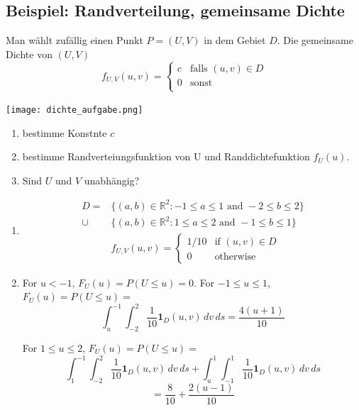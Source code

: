 \BoxEnd{}
\BoxStart{}
\subsection{Beispiel: Randverteilung, gemeinsame Dichte}
\begin{tiny}
  Man wählt zufällig einen Punkt $P = (U, V)$ in dem Gebiet $D$. Die gemeinsame Dichte von $(U, V)$
  \[
    f_{U, V} (u, v) =
    \begin{cases}
      c & \text{falls } (u, v) \in D \\
      0 & \text{sonst}               \\
    \end{cases}
  \]
  \begin{center}
    \texttt{[image: dichte\_aufgabe.png]}
  \end{center}
  \begin{enumerate}[noitemsep,topsep=0pt,parsep=0pt,partopsep=0pt]
    \item bestimme Konstnte $c$
    \item bestimme Randverteiungsfunktion von U und Randdichtefunktion $f_U(u)$.
    \item Sind $U$ und $V$ unabhängig?
  \end{enumerate}
  \begin{enumerate}[noitemsep,topsep=0pt,parsep=0pt,partopsep=0pt]
    \item
          \begin{align*}
            D =  & \{(a, b) \in \mathbb{R}^2 : -1 \leq a \leq 1 \text{ and } -2 \leq b \leq 2\} \\
            \cup & \{(a, b) \in \mathbb{R}^2 : 1 \leq a \leq 2 \text{ and } -1 \leq b \leq 1\}  \\
                 & f_{U,V}(u, v) =
            \begin{cases}
              1/10 & \text{if } (u, v) \in D \\
              0    & \text{otherwise}
            \end{cases}
          \end{align*}
    \item For $u < -1$, $F_U(u) = P(U \leq u) = 0$.
          For $-1 \leq u \leq 1$, $F_U(u) = P(U \leq u) = $
          \[
            \int_u^{-1} \int_{-2}^{2} \frac{1}{10} \mathbf{1}_D(u, v) \, dv \, ds = \frac{4(u + 1)}{10}
          \]

          For $1 \leq u \leq 2$, $F_U(u) = P(U \leq u) =$
          \[
            \int_1^{-1} \int_{-2}^{2} \frac{1}{10} \mathbf{1}_D(u, v) \, dv \, ds + \int_u^1 \int_{-1}^{1} \frac{1}{10} \mathbf{1}_D(u, v) \, dv \, ds
          \]
          \[
            = \frac{8}{10} + \frac{2(u - 1)}{10}
          \]


\end{enumerate}
\end{tiny}

